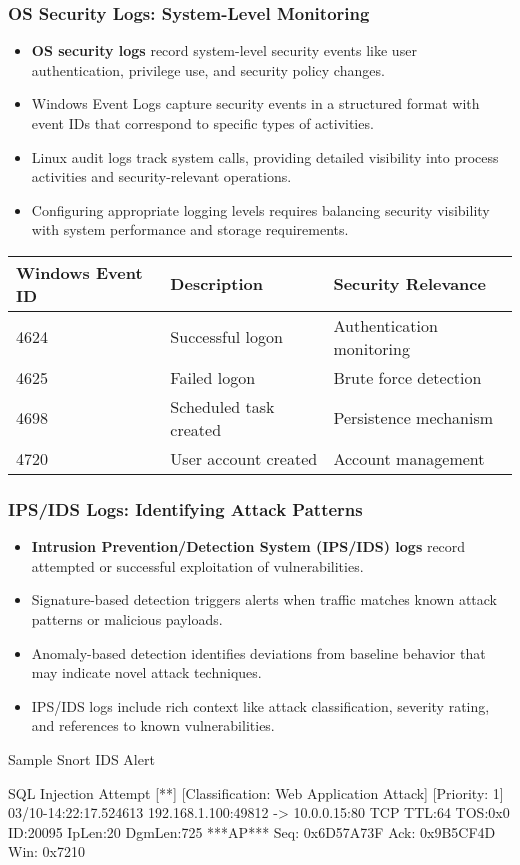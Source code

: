 \documentclass{beamer}
\begin{document}
\begin{frame}
\frametitle{OS Security Logs: System-Level Monitoring}
\begin{itemize}
\item \textbf{OS security logs} record system-level security events like user authentication, privilege use, and security policy changes.
\item Windows Event Logs capture security events in a structured format with event IDs that correspond to specific types of activities.
\item Linux audit logs track system calls, providing detailed visibility into process activities and security-relevant operations.
\item Configuring appropriate logging levels requires balancing security visibility with system performance and storage requirements.
\end{itemize}

\begin{center}
\scriptsize
\begin{tabular}{|l|l|l|}
\hline
\textbf{Windows Event ID} & \textbf{Description} & \textbf{Security Relevance} \\
\hline
4624 & Successful logon & Authentication monitoring \\
4625 & Failed logon & Brute force detection \\
4698 & Scheduled task created & Persistence mechanism \\
4720 & User account created & Account management \\
\hline
\end{tabular}
\end{center}
\end{frame}

\begin{frame}[fragile]
\frametitle{IPS/IDS Logs: Identifying Attack Patterns}
\begin{itemize}
\item \textbf{Intrusion Prevention/Detection System (IPS/IDS) logs} record attempted or successful exploitation of vulnerabilities.
\item Signature-based detection triggers alerts when traffic matches known attack patterns or malicious payloads.
\item Anomaly-based detection identifies deviations from baseline behavior that may indicate novel attack techniques.
\item IPS/IDS logs include rich context like attack classification, severity rating, and references to known vulnerabilities.
\end{itemize}

\begin{exampleblock}{Sample Snort IDS Alert}
\scriptsize
\begin{semiverbatim}
[**] [1:1000001:1] SQL Injection Attempt [**]
[Classification: Web Application Attack] [Priority: 1]
03/10-14:22:17.524613 192.168.1.100:49812 -> 10.0.0.15:80
TCP TTL:64 TOS:0x0 ID:20095 IpLen:20 DgmLen:725
***AP*** Seq: 0x6D57A73F Ack: 0x9B5CF4D Win: 0x7210
\end{semiverbatim}
\end{exampleblock}
\end{frame}
\end{document}
